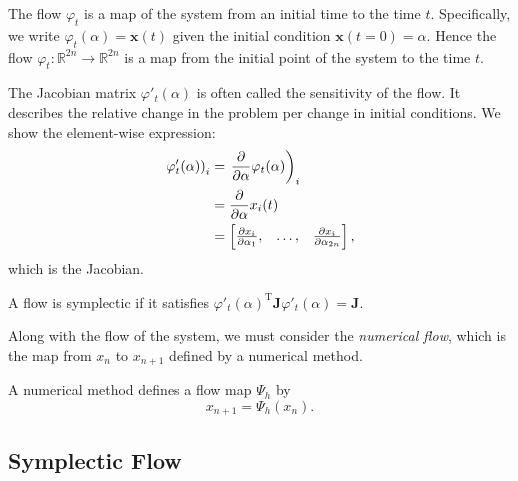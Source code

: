\begin{definition}
	The flow $\varphi_t$ is a map of the system from an initial time to the time $t$.
	Specifically, we write $\varphi_t(\alpha) = \mathbf{x}(t)$ given the initial condition $\mathbf{x}(t=0) = \alpha$. Hence the flow $\varphi_t:\mathds{R}^{2n}\rightarrow \mathds{R}^{2n}$ is a map from the initial point of the system to the time $t$.
\end{definition}
The Jacobian matrix $\varphi'_t({\alpha})$ is often called the sensitivity of the flow.
It describes the relative change in the problem per change in initial conditions.
We show the element-wise expression: %
\begin{align*}
	\left. \varphi'_t(\alpha) \right)_i &= \left. \frac{\partial}{\partial \alpha} \varphi_t(\alpha) \right)_i \\
	&= \frac{\partial}{\partial \alpha} x_i(t) \\
	&= \begin{bmatrix}
		\frac{\partial x_i}{\partial \alpha_1}, & \mathellipsis, & \frac{\partial x_i}{\partial \alpha_{2n}}
	\end{bmatrix},
\end{align*}
which is the Jacobian.
\begin{definition}
	A flow is symplectic if it satisfies $\varphi'_t(\alpha)^\mathrm{T} \mathbf{J} \varphi'_t(\alpha) = \mathbf{J}.$
\end{definition}
Along with the flow of the system, we must consider the \textit{numerical flow},
which is the map from $x_n$ to $x_{n+1}$ defined by a numerical method.
\begin{definition}
	A numerical method defines a flow map $\Psi_h$ by
	\begin{equation*}
		x_{n+1} = \Psi_h(x_n).
	\end{equation*}
\end{definition}

\subsection{Symplectic Flow}

